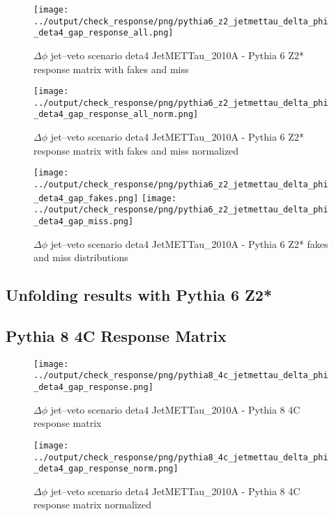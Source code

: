 \documentclass[11pt]{book}
\begin{document}
\begin{figure}[ht]
\centering
\texttt{[image: ../output/check\_response/png/pythia6\_z2\_jetmettau\_delta\_phi\_deta4\_gap\_response\_all.png]}
\caption{$\Delta\phi$ jet--veto scenario deta4 JetMETTau\_2010A - Pythia 6 Z2* response matrix with fakes and miss}
\label{p6_jetmettau_delta_phi_deta4_gap_response_all}
\end{figure}

\begin{figure}[ht]
\centering
\texttt{[image: ../output/check\_response/png/pythia6\_z2\_jetmettau\_delta\_phi\_deta4\_gap\_response\_all\_norm.png]}
\caption{$\Delta\phi$ jet--veto scenario deta4 JetMETTau\_2010A - Pythia 6 Z2* response matrix with fakes and miss normalized}
\label{p6_jetmettau_delta_phi_deta4_gap_response_all_norm}
\end{figure}

\begin{figure}[ht]
\centering
\texttt{[image: ../output/check\_response/png/pythia6\_z2\_jetmettau\_delta\_phi\_deta4\_gap\_fakes.png]}
\texttt{[image: ../output/check\_response/png/pythia6\_z2\_jetmettau\_delta\_phi\_deta4\_gap\_miss.png]}
\caption{$\Delta\phi$ jet--veto scenario deta4 JetMETTau\_2010A - Pythia 6 Z2* fakes and miss distributions}
\label{p6_jetmettau_delta_phi_deta4_gap_fakesmiss}
\end{figure}


\clearpage
\subsection{Unfolding results with Pythia 6 Z2*}


\clearpage
\subsection{Pythia 8 4C Response Matrix}


\begin{figure}[ht]
\centering
\texttt{[image: ../output/check\_response/png/pythia8\_4c\_jetmettau\_delta\_phi\_deta4\_gap\_response.png]}
\caption{$\Delta\phi$ jet--veto scenario deta4 JetMETTau\_2010A - Pythia 8 4C response matrix}
\label{p8_jetmettau_delta_phi_deta4_gap_response}
\end{figure}

\begin{figure}[ht]
\centering
\texttt{[image: ../output/check\_response/png/pythia8\_4c\_jetmettau\_delta\_phi\_deta4\_gap\_response\_norm.png]}
\caption{$\Delta\phi$ jet--veto scenario deta4 JetMETTau\_2010A - Pythia 8 4C response matrix normalized}
\label{p8_jetmettau_delta_phi_deta4_gap_response_norm}
\end{figure}
\end{document}

